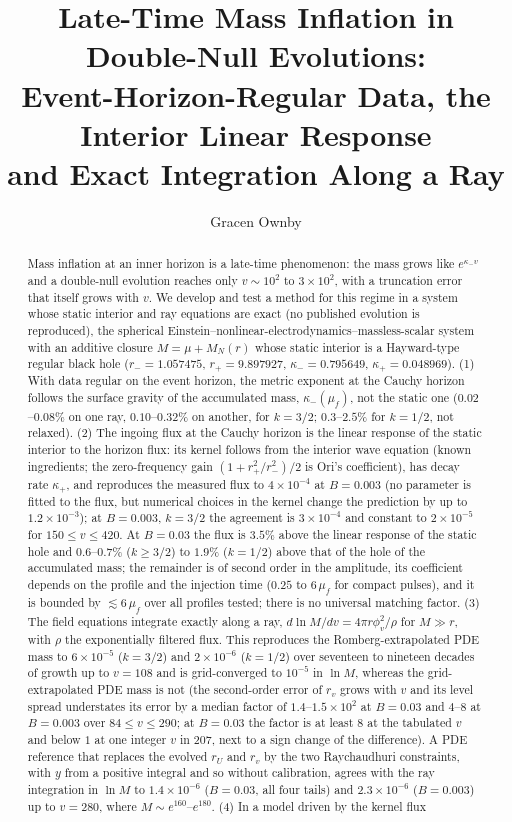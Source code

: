 \documentclass[11pt]{article}
\title{Late-Time Mass Inflation in Double-Null Evolutions:\\
Event-Horizon-Regular Data, the Interior Linear Response\\
and Exact Integration Along a Ray}
\author{Gracen Ownby}
\date{}
\begin{document}
\maketitle

\begin{abstract}
Mass inflation at an inner horizon is a late-time phenomenon: the mass grows like $e^{\kappa_-v}$ and a double-null evolution reaches only $v\sim10^{2}$ to $3\times10^{2}$, with a truncation error that itself grows with $v$. We develop and test a method for this regime in a system whose static interior and ray equations are exact (no published evolution is reproduced), the spherical Einstein--nonlinear-electrodynamics--massless-scalar system with an additive closure $M=\mu+M_N(r)$ whose static interior is a Hayward-type regular black hole ($r_-=1.057475$, $r_+=9.897927$, $\kappa_-=0.795649$, $\kappa_+=0.048969$). (1) With data regular on the event horizon, the metric exponent at the Cauchy horizon follows the surface gravity of the accumulated mass, $\kappa_-(\mu_f)$, not the static one ($0.02$--$0.08\%$ on one ray, $0.10$--$0.32\%$ on another, for $k=3/2$; $0.3$--$2.5\%$ for $k=1/2$, not relaxed). (2) The ingoing flux at the Cauchy horizon is the linear response of the static interior to the horizon flux: its kernel follows from the interior wave equation (known ingredients; the zero-frequency gain $(1+r_+^2/r_-^2)/2$ is Ori's coefficient), has decay rate $\kappa_+$, and reproduces the measured flux to $4\times10^{-4}$ at $B=0.003$ (no parameter is fitted to the flux, but numerical choices in the kernel change the prediction by up to $1.2\times10^{-3}$); at $B=0.003$, $k=3/2$ the agreement is $3\times10^{-4}$ and constant to $2\times10^{-5}$ for $150\le v\le420$. At $B=0.03$ the flux is $3.5\%$ above the linear response of the static hole and $0.6$--$0.7\%$ ($k\ge3/2$) to $1.9\%$ ($k=1/2$) above that of the hole of the accumulated mass; the remainder is of second order in the amplitude, its coefficient depends on the profile and the injection time ($0.25$ to $6\,\mu_f$ for compact pulses), and it is bounded by $\lesssim6\,\mu_f$ over all profiles tested; there is no universal matching factor. (3) The field equations integrate exactly along a ray, $d\ln M/dv=4\pi r\phi_v^2/\rho$ for $M\gg r$, with $\rho$ the exponentially filtered flux. This reproduces the Romberg-extrapolated PDE mass to $6\times10^{-5}$ ($k=3/2$) and $2\times10^{-6}$ ($k=1/2$) over seventeen to nineteen decades of growth up to $v=108$ and is grid-converged to $10^{-5}$ in $\ln M$, whereas the grid-extrapolated PDE mass is not (the second-order error of $r_v$ grows with $v$ and its level spread understates its error by a median factor of $1.4$--$1.5\times10^{2}$ at $B=0.03$ and $4$--$8$ at $B=0.003$ over $84\le v\le290$; at $B=0.03$ the factor is at least $8$ at the tabulated $v$ and below $1$ at one integer $v$ in $207$, next to a sign change of the difference). A PDE reference that replaces the evolved $r_U$ and $r_v$ by the two Raychaudhuri constraints, with $y$ from a positive integral and so without calibration, agrees with the ray integration in $\ln M$ to $1.4\times10^{-6}$ ($B=0.03$, all four tails) and $2.3\times10^{-6}$ ($B=0.003$) up to $v=280$, where $M\sim e^{160}$--$e^{180}$. (4) In a model driven by the kernel flux 
\end{abstract}
\end{document}
